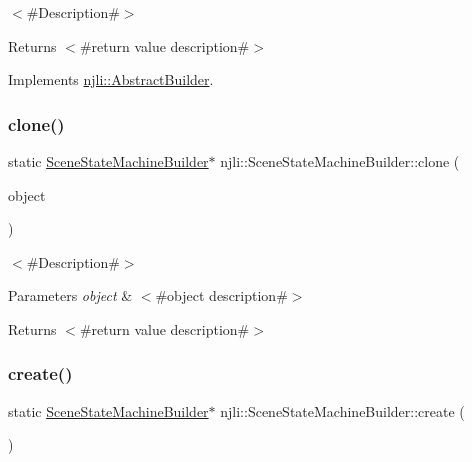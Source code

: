 $<$\#\+Description\#$>$

\begin{DoxyReturn}{Returns}
$<$\#return value description\#$>$ 
\end{DoxyReturn}


Implements \mbox{\hyperlink{classnjli_1_1_abstract_builder_aa1d220053e182c37b31b427499c6eacf}{njli\+::\+Abstract\+Builder}}.

\mbox{\label{classnjli_1_1_scene_state_machine_builder_ac50a3efc74db66ef90683651cf1f9a8d}} 
\subsubsection{\texorpdfstring{clone()}{clone()}}
{\footnotesize\ttfamily static \mbox{\hyperlink{classnjli_1_1_scene_state_machine_builder}{Scene\+State\+Machine\+Builder}}$\ast$ njli\+::\+Scene\+State\+Machine\+Builder\+::clone (\begin{DoxyParamCaption}\item[{const \mbox{\hyperlink{classnjli_1_1_scene_state_machine_builder}{Scene\+State\+Machine\+Builder}} \&}]{object }\end{DoxyParamCaption})\hspace{0.3cm}{\ttfamily [static]}}

$<$\#\+Description\#$>$


\begin{DoxyParams}{Parameters}
{\em object} & $<$\#object description\#$>$\\
\hline
\end{DoxyParams}
\begin{DoxyReturn}{Returns}
$<$\#return value description\#$>$ 
\end{DoxyReturn}
\mbox{\label{classnjli_1_1_scene_state_machine_builder_aea2b1500804bee4d04c625f16f0b83b3}} 
\subsubsection{\texorpdfstring{create()}{create()}}
{\footnotesize\ttfamily static \mbox{\hyperlink{classnjli_1_1_scene_state_machine_builder}{Scene\+State\+Machine\+Builder}}$\ast$ njli\+::\+Scene\+State\+Machine\+Builder\+::create (\begin{DoxyParamCaption}{ }\end{DoxyParamCaption})\hspace{0.3cm}{\ttfamily [static]}}

